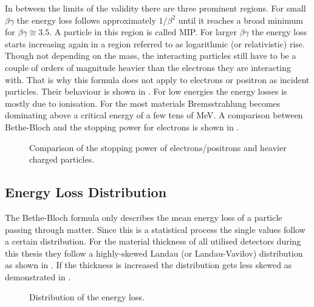 In between the limits of the validity there are three prominent regions. For small $\beta\gamma$ the energy loss follows approximately $1/\beta^2$ until it reaches a broad minimum for $\beta\gamma \cong 3.5 $. A particle in this region is called \ac{MIP}. For larger $\beta\gamma$ the energy loss starts increasing again in a region referred to as logarithmic (or relativistic) rise.\\
Though not depending on the mass, the interacting particles still have to be a couple of orders of magnitude heavier than the electrons they are interacting with. That is why this formula does not apply to electrons or positron as incident particles. Their behaviour is shown in . For low energies the energy losses is mostly due to ionisation. For the most materials Bremsstrahlung becomes dominating above a critical energy of a few tens of MeV. A comparison between Bethe-Bloch and the stopping power for electrons is shown in .
\begin{figure}[ht]
	\centering
	\hfill
	\caption{Comparison of the stopping power of electrons/positrons and heavier charged particles.}
	\label{pcomp}
\end{figure}\no
\subsection{Energy Loss Distribution}\label{slandau}
The Bethe-Bloch formula only describes the mean energy loss of a particle passing through matter. Since this is a statistical process the single values follow a certain distribution. For the material thickness of all utilised detectors during this thesis they follow a highly-skewed Landau (or Landau-Vavilov) distribution as shown in . If the thickness is increased the distribution gets less skewed as demonstrated in  \cite{pdg}.
\begin{figure}[ht]
	\centering
	\hfill
	\caption{Distribution of the energy loss.}
	\label{plan}
\end{figure}\no
